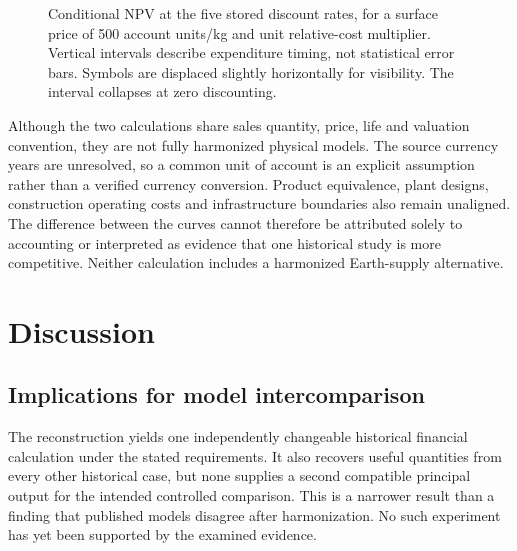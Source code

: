 \documentclass[final,5p,times,twocolumn]{elsarticle}
\begin{document}
\begin{figure}[t]
\caption{Conditional NPV at the five stored discount rates, for a surface price of 500 account units/kg and unit relative-cost multiplier. Vertical intervals describe expenditure timing, not statistical error bars. Symbols are displaced slightly horizontally for visibility. The interval collapses at zero discounting.}\label{fig:rates}\end{figure}

Although the two calculations share sales quantity, price, life and valuation convention, they are not fully harmonized physical models. The source currency years are unresolved, so a common unit of account is an explicit assumption rather than a verified currency conversion. Product equivalence, plant designs, construction operating costs and infrastructure boundaries also remain unaligned. The difference between the curves cannot therefore be attributed solely to accounting or interpreted as evidence that one historical study is more competitive. Neither calculation includes a harmonized Earth-supply alternative.

\section{Discussion}
\subsection{Implications for model intercomparison}
The reconstruction yields one independently changeable historical financial calculation under the stated requirements. It also recovers useful quantities from every other historical case, but none supplies a second compatible principal output for the intended controlled comparison. This is a narrower result than a finding that published models disagree after harmonization. No such experiment has yet been supported by the examined evidence.
\end{document}
